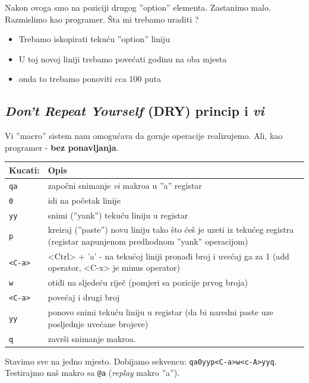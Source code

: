 \documentclass[times, utf8, seminar]{fit}
\begin{document}
Nakon ovoga smo na poziciji drugog ''option'' elementa. Zastanimo malo. Razmislimo kao programer. Šta mi trebamo uraditi ? 
\begin{itemize}
  \item Trebamo iskopirati tekuću ''option'' liniju
  \item U toj novoj liniji trebamo povećati godinu na oba mjesta
  \item onda to trebamo ponoviti cca 100 puta
\end{itemize}

\subsection{\emph{Don't Repeat Yourself} (DRY) princip i \emph{vi}}
 
Vi ''macro'' sistem nam omogućava da gornje operacije realizujemo. Ali, kao programer - \textbf{bez ponavljanja}.

\begin{center}
\begin{tabular}{ |p{4cm}|p{10cm}| }
  \hline                        
   Kucati:    &  Opis \\ 
   \hline
   \verb+qa+     & započni snimanje \emph{vi} makroa u ''a'' registar \\
   \verb+0+      & idi na početak linije \\
   \verb+yy+     & snimi (''yank'') tekuću liniju u registar \\
   \verb+p+      & kreiraj (''paste'') novu liniju tako što ćeš je uzeti iz tekućeg registra (registar napunjenom predhodnom ''yank'' operacijom) \\
   \verb+<C-a>+  & <Ctrl> + 'a' - na tekućoj liniji pronađi broj i uvećaj ga za 1 (add operator, <C-x> je minus operator) \\
   \verb+w+      & otiđi na sljedeću riječ (pomjeri sa pozicije prvog broja) \\
   \verb+<C-a>+  & povećaj i drugi broj \\
   \verb+yy+     & ponovo snimi tekuću liniju u registar (da bi naredni paste uze posljednje uvećane brojeve) \\
   \verb+q+      & završi snimanje makroa.\\
   \hline
\end{tabular}
\end{center}

Stavimo sve na jedno mjesto. Dobijamo sekvencu: \verb+qa0yyp<C-a>w<c-A>yyq+. \newline Testirajmo naš makro sa \verb+@a+ (\emph{replay} makro ''a''). 
\end{document}
